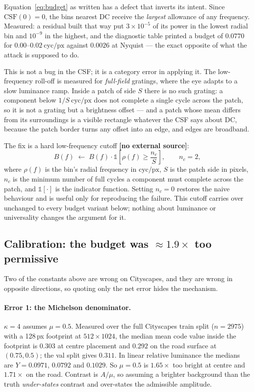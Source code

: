 \documentclass[11pt,a4paper]{article}
\newcommand{\novel}{\textbf{[no external source]}}
\newcommand{\cpp}{\mathrm{cyc/px}}
\begin{document}
Equation~\eqref{eq:budget} as written has a defect that inverts its
intent. Since $\mathrm{CSF}(0)=0$, the bins nearest DC receive the
\emph{largest} allowance of any frequency. Measured: a residual built that
way put $3\times10^{-5}$ of its power in the lowest radial bin and
$10^{-9}$ in the highest, and the diagnostic table printed a budget of
$0.0770$ for $0.00$--$0.02\ \cpp$ against $0.0026$ at Nyquist --- the exact
opposite of what the attack is supposed to do.

This is not a bug in the CSF; it is a category error in applying it. The
low-frequency roll-off is measured for \emph{full-field} gratings, where the
eye adapts to a slow luminance ramp. Inside a patch of side $S$ there is no
such grating: a component below $1/S\ \cpp$ does not complete a single cycle
across the patch, so it is not a grating but a brightness offset --- and a
patch whose mean differs from its surroundings is a visible rectangle
whatever the CSF says about DC, because the patch border turns any offset
into an edge, and edges are broadband.

The fix is a hard low-frequency cutoff \novel{}:
\begin{equation}
  B(f) \;\leftarrow\; B(f)\cdot
     \mathbb{1}\!\left[\rho(f) \ge \frac{n_c}{S}\right],
  \qquad n_c = 2 ,
  \label{eq:mincycles}
\end{equation}
where $\rho(f)$ is the bin's radial frequency in $\cpp$, $S$ is the patch
side in pixels, $n_c$ is the minimum number of full cycles a component must
complete across the patch, and $\mathbb{1}[\cdot]$ is the indicator
function. Setting $n_c=0$ restores the naive behaviour and is useful only
for reproducing the failure. This cutoff carries over unchanged to every
budget variant below; nothing about luminance or universality changes the
argument for it.

\subsection{Calibration: the budget was $\approx1.9\times$ too permissive}
\label{sec:calib}

Two of the constants above are wrong on Cityscapes, and they are wrong in
opposite directions, so quoting only the net error hides the mechanism.

\paragraph{Error 1: the Michelson denominator.}
$\kappa=4$ assumes $\mu=0.5$. Measured over the full Cityscapes train split
($n=2975$) with a 128\,px footprint at $512\times1024$, the median mean code
value inside the footprint is $0.303$ at centre placement and $0.292$ on the
road surface at $(0.75,0.5)$; the val split gives $0.311$. In linear
relative luminance the medians are $Y=0.0971$, $0.0792$ and $0.1029$. So
$\mu=0.5$ is $1.65\times$ too bright at centre and $1.71\times$ on the road.
Contrast is $A/\mu$, so assuming a brighter background than the truth
\emph{under-states} contrast and over-states the admissible amplitude.
\end{document}
